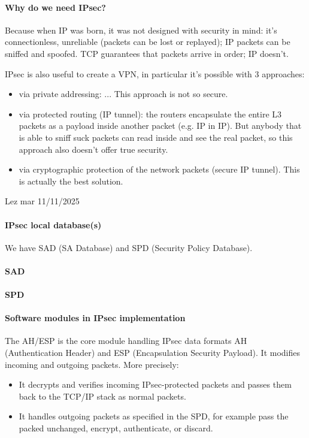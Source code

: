 \paragraph{Why do we need IPsec?}
Because when IP was born, it was not designed with security in mind: it's connectionless, unreliable (packets can be lost or replayed); IP packets can be sniffed and spoofed. TCP guarantees that packets arrive in order; IP doesn't.

IPsec is also useful to create a VPN, in particular it's possible with 3 approaches:
\begin{itemize}
    \item via private addressing: ... This approach is not so secure.
    \item via protected routing (IP tunnel): the routers encapsulate the entire L3 packets as a payload inside another packet (e.g. IP in IP). But anybody that is able to sniff suck packets can read inside and see the real packet, so this approach also doesn't offer true security.
    \item via cryptographic protection of the network packets (secure IP tunnel). This is actually the best solution.
\end{itemize}

Lez mar 11/11/2025

\paragraph{IPsec local database(s)}
We have SAD (SA Database) and SPD (Security Policy Database).

\paragraph{SAD}
\paragraph{SPD}

\paragraph{Software modules in IPsec implementation}
The AH/ESP is the core module handling IPsec data formats AH (Authentication Header) and ESP (Encapsulation Security Payload). It modifies incoming and outgoing packets. More precisely:
\begin{itemize}
    \item It decrypts and verifies incoming IPsec-protected packets and passes them back to the TCP/IP stack as normal packets.

    \item It handles outgoing packets as specified in the SPD, for example pass the packed unchanged, encrypt, authenticate, or discard.
\end{itemize}

